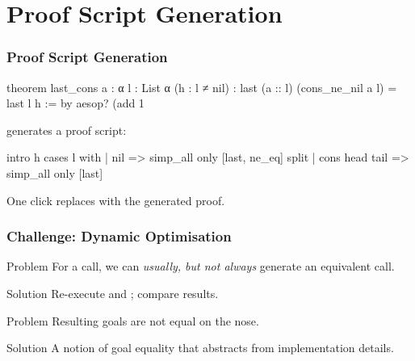 \documentclass[xetex]{beamer}
\begin{document}
\section{Proof Script Generation}

\begin{frame}[fragile]
  \frametitle{Proof Script Generation}

  \begin{leancode}
    theorem last_cons {a : α} {l : List α} (h : l ≠ nil) :
        last (a :: l) (cons_ne_nil a l) = last l h := by
      aesop? (add 1%
  \end{leancode}

  \pause

   generates a proof script:

  \begin{leancode}
    intro h
    cases l with
    | nil =>
      simp_all only [last, ne_eq]
      split
    | cons head tail => simp_all only [last]
  \end{leancode}

  One click replaces  with the generated proof.
\end{frame}

\begin{frame}[fragile]
  \frametitle{Challenge: Dynamic Optimisation}

  \begin{block}{Problem}
    For a  call, we can \emph{usually, but not always} generate an equivalent  call.
  \end{block}

  \pause

  \begin{block}{Solution}
    Re-execute  and ; compare results.
  \end{block}

  \pause

  \begin{block}{Problem}
    Resulting goals are not equal on the nose.
  \end{block}

  \pause

  \begin{block}{Solution}
    A notion of goal equality that abstracts from implementation details.
  \end{block}
\end{frame}
\end{document}
